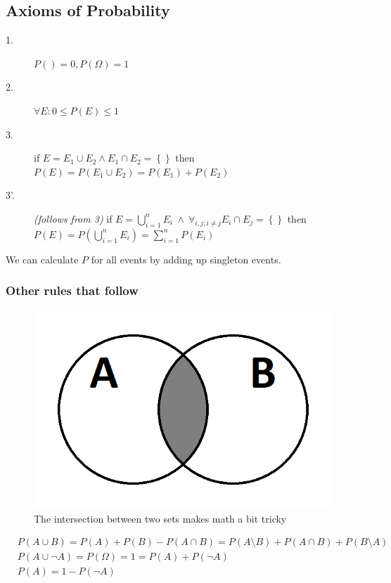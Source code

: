 \subsection{Axioms of Probability}
\begin{description}
	\item[1.] $P({}) = 0, P(\Omega) = 1$
  \item[2.] $\forall E: 0 \leq P(E) \leq 1$
  \item[3.] if $E = E_1 \cup E_2 \wedge E_1 \cap E_2 = \left\{ \right\}$ 
            then $P(E) = P(E_1 \cup E_2) = P(E_1) + P(E_2)$
  \item[3'.] \textit{(follows from 3)} 
            if $E = \bigcup_{i=1}^n E_i \  \wedge \ \forall_{i, j; i \neq j} E_i \cap E_j = \left\{ \right\}$
            then $P(E) = P(\bigcup_{i=1}^n E_i) = \sum_{i=1}^{n}{P(E_i)}$
\end{description}

We can calculate $P$ for all events by adding up singleton events.

\subsubsection*{Other rules that follow}
\begin{figure}[ht]
  \begin{center}
    \includegraphics[scale=0.3]{venn_diagram_a_intersects_b}
    \caption{The intersection between two sets makes math a bit tricky}
    \label{fig:venn_a_inter_b}
  \end{center}
\end{figure}

\begin{align*}
& P(A \cup B) = P(A) + P(B) - P(A \cap B) = P(A \setminus B) + P(A \cap B) + P(B \setminus A)\\
& P(A \cup \neg A) = P(\Omega) = 1 = P(A) + P(\neg A)\\
& P(A) = 1- P(\neg A)
\end{align*}



